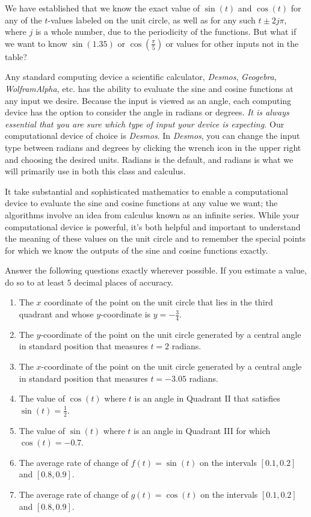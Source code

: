 \documentclass[nooutcomes]{ximera}
\begin{document}
We have established that we know the exact value of \(\sin(t)\) and \(\cos(t)\) for any of the \(t\)-values labeled on the unit circle, as well as for any such \(t \pm 2j\pi\), where \(j\) is a whole number, due to the periodicity of the functions.  But what if we want to know \(\sin(1.35)\) or \(\cos(\frac{\pi}{5})\) or values for other inputs not in the table?%

Any standard computing device a scientific calculator, \emph{Desmos}, \emph{Geogebra}, \emph{WolframAlpha}, etc. has the ability to evaluate the sine and cosine functions at any input we desire.  Because the input is viewed as an angle, each computing device has the option to consider the angle in radians or degrees.  \emph{It is always essential that you are sure which type of input your device is expecting.}  Our computational device of choice is \emph{Desmos}.  In \emph{Desmos}, you can change the input type between radians and degrees by clicking the wrench icon in the upper right and choosing the desired units.  Radians is the default, and radians is what we will primarily use in both this class and calculus.%

It take substantial and sophisticated mathematics to enable a computational device to evaluate the sine and cosine functions at any value we want; the algorithms involve an idea from calculus known as an infinite series.  While your computational device is powerful, it's both helpful and important to understand the meaning of these values on the unit circle and to remember the special points for which we know the outputs of the sine and cosine functions exactly.%
\begin{exploration}

Answer the following questions exactly wherever possible.  If you estimate a value, do so to at least \(5\) decimal places of accuracy.%

\begin{enumerate}[label=\alph*.]
\item
The \(x\) coordinate of the point on the unit circle that lies in the third quadrant and whose \(y\)-coordinate is \(y = -\frac{3}{4}\).%
\item
The \(y\)-coordinate of the point on the unit circle generated by a central angle in standard position that measures \(t = 2\) radians.%
\item
The \(x\)-coordinate of the point on the unit circle generated by a central angle in standard position that measures \(t = -3.05\) radians.%
\item
The value of \(\cos(t)\) where \(t\) is an angle in Quadrant II that satisfies \(\sin(t) = \frac{1}{2}\).%
\item
The value of \(\sin(t)\) where \(t\) is an angle in Quadrant III for which \(\cos(t) = -0.7\).%
\item
The average rate of change of \(f(t) = \sin(t)\) on the intervals \([0.1,0.2]\) and \([0.8,0.9]\).%
\item
The average rate of change of \(g(t) = \cos(t)\) on the intervals \([0.1,0.2]\) and \([0.8,0.9]\).%
\end{enumerate}
%
\end{exploration}
\end{document}
